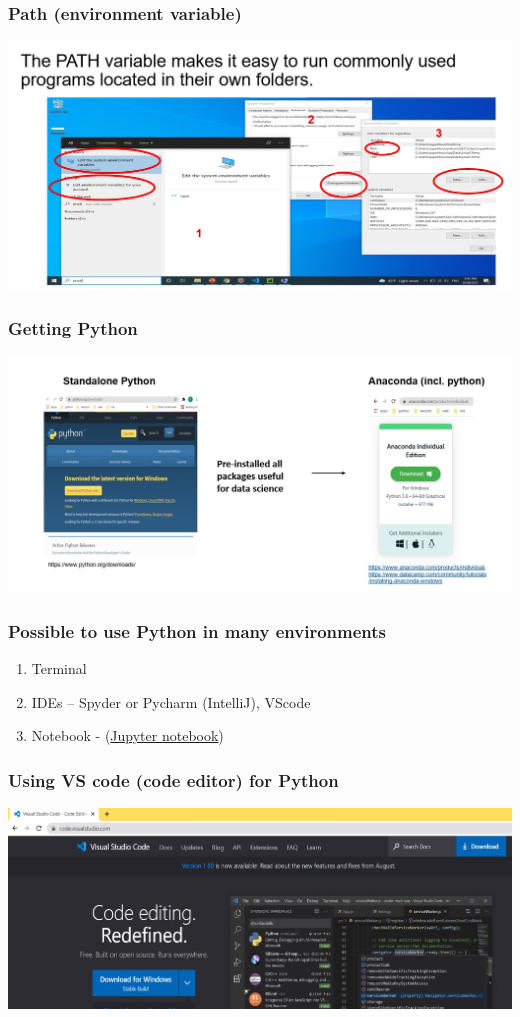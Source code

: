 \documentclass{beamer}
\begin{document}
\begin{frame}
    \frametitle{Path (environment variable)}
    \centering
    \includegraphics[scale = 0.5]{figures/path.jpg}
\end{frame}

\begin{frame}
    \frametitle{Getting Python}
    \centering
    \includegraphics[scale = 0.35]{figures/getpython.jpg}
\end{frame}

\begin{frame}
    \frametitle{Possible to use Python in many environments}

    \begin{enumerate}
        \item Terminal
        \item IDEs – Spyder or Pycharm (IntelliJ), VScode
        \item Notebook -  (\href{https://github.com/susanli2016/Machine-Learning-with-Python}
        {Jupyter notebook})
    \end{enumerate}
\end{frame}

\begin{frame}
    \frametitle{Using VS code (code editor) for Python}
    \centering
    \includegraphics[scale = 0.5]{figures/vscode.jpg}
\end{frame}
\end{document}
